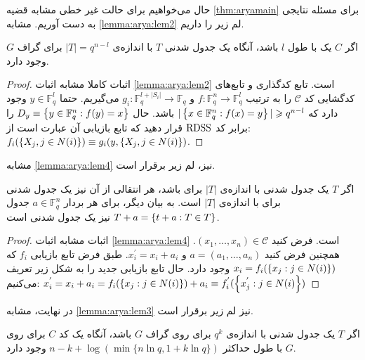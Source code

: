 حال می‌خواهیم برای حالت غیر خطی مشابه قضیه
 \autoref{thm:aryamain}
برای مسئله
\picod
نتایجی به دست آوریم. مشابه
 \autoref{lemma:arya:lem2}
 لم زیر را داریم.
\begin{lemma}
	\label{lamma:our:lemma2}
	اگر
	$C$
	یک \picod با طول
	$l$
	باشد، آنگاه یک جدول شدنی
	$T$
	با اندازه‌ی
	$|T| = q^{n - l}$
	برای گراف
	$G$
	وجود دارد.
\end{lemma}
\begin{proof}
	اثبات کاملا مشابه اثبات
	\autoref{lemma:arya:lem2}
	است. تابع کدگذاری و تابع‌های کدگشایی کد
	$\mathcal{C}$
	را به ترتیب
	$f: \mathbb{F}_q^n \rightarrow \mathbb{F}_q^l$
	و
	$g_i: \mathbb{F}_q^{l + |S_i|} \rightarrow \mathbb{F}_q$
	می‌گیریم. حتما
	$y \in \mathbb{F}_q^{l}$
	وجود دارد که
	$|\left\{ x \in \mathbb{F}_q^n: f(x) = y \right\}| \geqslant q^{n - l}$
	باشد. حال
	$D_y \equiv \left\{ y \in \mathbb{F}_q^n: f(y) = x \right\}$
	را برابر کد
	$\mathrm{RDSS}$
	قرار دهید که تابع بازیابی آن عبارت است از:
	$f_i(\left\{ X_j, j \in N(i) \right\}) \equiv g_i(y, \left\{ X_j, j \in N(i) \right\})$.
\end{proof}
مشابه
\autoref{lemma:arya:lem4}
نیز، لم زیر برقرار است.
\begin{lemma}
	\label{lemma:our:lemma4}
	اگر
	$T$
	یک جدول شدنی با اندازه‌ی
	$|T|$
	 برای 
	\psicod
	باشد، هر انتقالی از آن نیز یک جدول شدنی برای
	\psicod
	با اندازه‌ی $|T|$ است. به بیان دیگر، برای هر بردار
	$a \in \mathbb{F}_q^n$
	جدول
	$T + a = \left\{ t + a: T \in T \right\}$
	نیز یک جدول شدنی است.
\end{lemma}
\begin{proof}
	اثبات مشابه اثبات
	\autoref{lemma:arya:lem4}
	است.
	فرض کنید
	$(x_1, \ldots, x_n) \in \mathcal{C}$.
	همچنین فرض کنید
	$a = (a_1, \dots,  a_n)$
	و
	$x_i^{'} = x_i + a_i$.
	طبق فرض تابع بازیابی
	$f_i$
	که
	$x_i = f_i(\left\{ x_j: j \in N(i) \right\})$
	وجود دارد. حال تابع بازیابی جدید را به شکل زیر تعریف می‌کنیم:
	$x_i^{'} = x_i +a_i = f_i(\left\{ x_j: j \in N(i) \right\}) + a_i \equiv f_i^{'}(\left\{ x_j^{'}: j \in N(i) \right\})$
\end{proof}
در نهایت، مشابه
\autoref{lemma:arya:lem3}
نیز لم زیر برقرار است.
\begin{lemma}
	\label{lemma:our:lemma3}
	اگر
	$T$
	یک جدول شدنی با اندازه‌ی
	$q^k$
	برای 
	\psicod
	روی گراف
	$G$
	باشد، آنگاه یک کد
	$C$
	برای
	\picod
	روی 
	$G$
	با طول حداکثر
	$n - k + \log(\min{ \{n \ln q, 1 + k \ln q \} })$
	وجود دارد.
\end{lemma}
